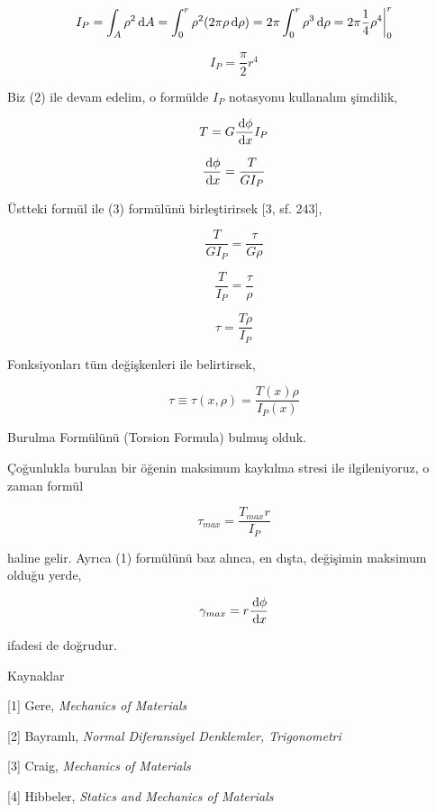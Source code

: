 \documentclass[12pt,fleqn]{article}\usepackage{../../common}
\begin{document}
$$
I_P = \int_A \rho^2 \,\mathrm{d} A =
\int_{0}^{r} \rho^2 (2\pi\rho \,\mathrm{d} \rho) =
2\pi \int_{0}^{r} \rho^3 \,\mathrm{d} \rho =
2\pi \frac{1}{4} \rho^4 \bigg\vert_{0}^{r}
$$

$$
I_P = \frac{\pi}{2} r^4
$$

Biz (2) ile devam edelim, o formülde $I_P$ notasyonu kullanalım şimdilik,

$$
T = G \frac{\,\mathrm{d} \phi}{\,\mathrm{d} x} I_P
$$

$$
\frac{\,\mathrm{d} \phi}{\,\mathrm{d} x} = \frac{T}{G I_P}
$$

Üstteki formül ile (3) formülünü birleştirirsek [3, sf. 243],

$$
\frac{T}{G I_P} = \frac{\tau}{G \rho }
$$

$$
\frac{T}{I_P} = \frac{\tau}{\rho }
$$

$$
\tau = \frac{T\rho}{I_P} 
$$

Fonksiyonları tüm değişkenleri ile belirtirsek,

$$
\tau \equiv \tau(x,\rho) = \frac{T(x) \rho}{I_P(x)} 
$$


Burulma Formülünü (Torsion Formula) bulmuş olduk.

Çoğunlukla burulan bir öğenin maksimum kaykılma stresi ile ilgileniyoruz, o
zaman formül

$$
\tau_{max} = \frac{T_{max} r}{I_P} 
$$

haline gelir. Ayrıca (1) formülünü baz alınca, en dışta, değişimin maksimum
olduğu yerde,

$$
\gamma_{max} = r \frac{\,\mathrm{d} \phi}{\,\mathrm{d} x}
$$

ifadesi de doğrudur. 

Kaynaklar

[1] Gere, {\em Mechanics of Materials}

[2] Bayramlı, {\em Normal Diferansiyel Denklemler, Trigonometri}

[3] Craig, {\em Mechanics of Materials}

[4] Hibbeler, {\em Statics and Mechanics of Materials}
\end{document}
